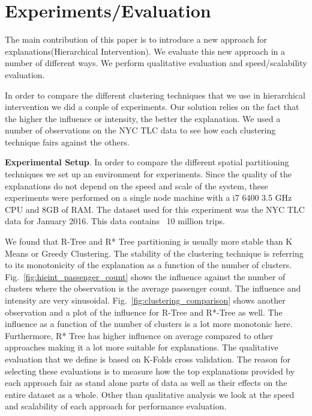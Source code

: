 \chapter{Experiments/Evaluation}
\label{chp:eval}
\label{sec:evaluation}
The main contribution of this paper is to introduce a new approach for explanations(Hierarchical Intervention). We evaluate this new approach in a number of different ways. We perform qualitative evaluation and speed/scalability evaluation.

In order to compare the different clustering techniques that we use in hierarchical intervention we did a couple of experiments. Our solution relies on the fact that the higher the influence or intensity, the better the explanation. We used a number of observations on the NYC TLC data to see how each clustering technique fairs against the others.

\textbf{Experimental Setup}. In order to compare the different spatial partitioning techniques we set up an environment for experiments. Since the quality of the explanations do not depend on the speed and scale of the system, these experiments were performed on a single node machine with a i7 6400 3.5 GHz CPU and 8GB of RAM. The dataset used for this experiment was the NYC TLC data for January 2016. This data contains ~10 million trips.

We found that R-Tree and R* Tree partitioning is usually more stable than K Means or Greedy Clustering. The stability of the clustering technique is referring to its monotonicity of the explanation as a function of the number of clusters. Fig.~\ref{fig:hieint_passenger_count} shows the influence against the number of clusters where the observation is the average passenger count. The influence and intensity are very sinusoidal. Fig.~\ref{fig:clustering_comparison} shows another observation and a plot of the influence for R-Tree and R*-Tree as well. The influence as a function of the number of clusters is a lot more monotonic here. Furthermore, R* Tree has higher influence on average compared to other approaches making it a lot more suitable for explanations.
The qualitative evaluation that we define is based on K-Folds cross validation. The reason for selecting these evaluations is to measure how the top explanations provided by each approach fair as stand alone parts of data as well as their effects on the entire dataset as a whole. Other than qualitative analysis we look at the speed and scalability of each approach for performance evaluation.

